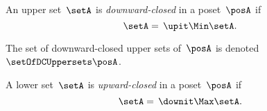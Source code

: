 \begin{comment}
    \item \emph{Transitivity}: One has
    \begin{equation}
      \begin{aligned}
        \left(A\posAAleq B\right) \wedge \left(B\posAAleq C\right)&\Leftrightarrow  \left(\upit  A \supseteq \ \upit  \ B\right) \wedge \left( \upit   B\supseteq \ \upit  C\right)\\
        &\Imp \ \upit  A\supseteq \ \upit  C\\
        &\Imp A\posAAleq C.
      \end{aligned}
    \end{equation}
    In order to find the top, we need to find the smallest set~$\postop_{\posAA}$ such that~$A\posAAleq \postop_{\posAA}$ for all~$A\in \posAA$.
    In other words, such that~$\upit  A\supseteq \ \upit  \postop_{\posAA}$ for all~$A\in \posAA$. This is clearly~$\emptyset$, since~$\upit  \emptyset = \emptyset$.
    Similarly, in order to find the bottom, we need to find the set~$\posbot_{\posAA}$ such that~$\posbot_{\posAA} \posAAleq A$ for all~$A\in \posAA$.
    In other words, such that~$\upit  \posbot_{\posAA} \supseteq \ \upit  A$ for all~$A\in \posAA$.
    We obtain a bottom if we set~$\posbot_{\posAA} \definedas \postop_{\posA}$, since~$\postop_{\posA} \supseteq A$ for all~$A \subseteq P$, and hence, by monotonicity of~$\upit $, we have in particular~$\upit  \postop_{\posA} \supseteq \upit  A$ for all antichains~$A$.
  \end{compactitem}
\end{proof}
\end{comment}

\begin{definition}
  \label{def:downward-closed-upperset}
  An upper set~$\setA$ is \emph{downward-closed} in a poset~$\posA$ if
  \begin{equation}
    \setA =\, \upit  \Min \setA.
  \end{equation}
\end{definition}

The set of downward-closed upper sets of~$\posA$ is denoted~$\setOfDCUppersets \posA$.

\begin{definition}
  \label{def:upward-closed-lowerset}
  A lower set~$\setA$ is \emph{upward-closed} in a poset~$\posA$ if
  \begin{equation}
    \setA =\, \downit  \Max \setA.
  \end{equation}
\end{definition}

